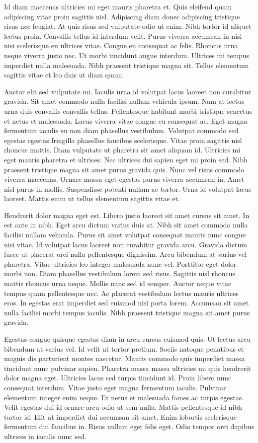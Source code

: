 \documentclass[11pt,a4paper]{article}
\begin{document}
Id diam maecenas ultricies mi eget mauris pharetra et. Quis eleifend quam adipiscing vitae proin sagittis nisl. Adipiscing diam donec adipiscing tristique risus nec feugiat. At quis risus sed vulputate odio ut enim. Nibh tortor id aliquet lectus proin. Convallis tellus id interdum velit. Purus viverra accumsan in nisl nisi scelerisque eu ultrices vitae. Congue eu consequat ac felis. Rhoncus urna neque viverra justo nec. Ut morbi tincidunt augue interdum. Ultrices mi tempus imperdiet nulla malesuada. Nibh praesent tristique magna sit. Tellus elementum sagittis vitae et leo duis ut diam quam.

Auctor elit sed vulputate mi. Iaculis urna id volutpat lacus laoreet non curabitur gravida. Sit amet commodo nulla facilisi nullam vehicula ipsum. Nam at lectus urna duis convallis convallis tellus. Pellentesque habitant morbi tristique senectus et netus et malesuada. Lacus viverra vitae congue eu consequat ac. Eget magna fermentum iaculis eu non diam phasellus vestibulum. Volutpat commodo sed egestas egestas fringilla phasellus faucibus scelerisque. Vitae proin sagittis nisl rhoncus mattis. Diam vulputate ut pharetra sit amet aliquam id. Ultricies mi eget mauris pharetra et ultrices. Nec ultrices dui sapien eget mi proin sed. Nibh praesent tristique magna sit amet purus gravida quis. Nunc vel risus commodo viverra maecenas. Ornare massa eget egestas purus viverra accumsan in. Amet nisl purus in mollis. Suspendisse potenti nullam ac tortor. Urna id volutpat lacus laoreet. Mattis enim ut tellus elementum sagittis vitae et.

Hendrerit dolor magna eget est. Libero justo laoreet sit amet cursus sit amet. In est ante in nibh. Eget arcu dictum varius duis at. Nibh sit amet commodo nulla facilisi nullam vehicula. Purus sit amet volutpat consequat mauris nunc congue nisi vitae. Id volutpat lacus laoreet non curabitur gravida arcu. Gravida dictum fusce ut placerat orci nulla pellentesque dignissim. Arcu bibendum at varius vel pharetra. Vitae ultricies leo integer malesuada nunc vel. Porttitor eget dolor morbi non. Diam phasellus vestibulum lorem sed risus. Sagittis nisl rhoncus mattis rhoncus urna neque. Mollis nunc sed id semper. Auctor neque vitae tempus quam pellentesque nec. Ac placerat vestibulum lectus mauris ultrices eros. In egestas erat imperdiet sed euismod nisi porta lorem. Accumsan sit amet nulla facilisi morbi tempus iaculis. Nibh praesent tristique magna sit amet purus gravida.

Egestas congue quisque egestas diam in arcu cursus euismod quis. Ut lectus arcu bibendum at varius vel. Id velit ut tortor pretium. Sociis natoque penatibus et magnis dis parturient montes nascetur. Mauris commodo quis imperdiet massa tincidunt nunc pulvinar sapien. Pharetra massa massa ultricies mi quis hendrerit dolor magna eget. Ultricies lacus sed turpis tincidunt id. Proin libero nunc consequat interdum. Vitae justo eget magna fermentum iaculis. Pulvinar elementum integer enim neque. Et netus et malesuada fames ac turpis egestas. Velit egestas dui id ornare arcu odio ut sem nulla. Mattis pellentesque id nibh tortor id. Elit at imperdiet dui accumsan sit amet. Enim lobortis scelerisque fermentum dui faucibus in. Risus nullam eget felis eget. Odio tempor orci dapibus ultrices in iaculis nunc sed.
\end{document}
